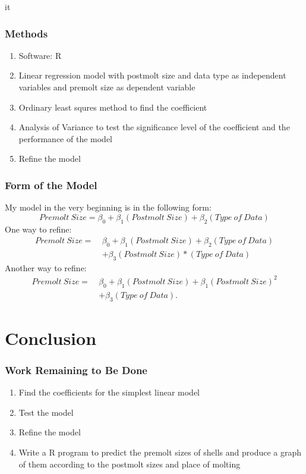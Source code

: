 it\documentclass[compress,handout,10pt]{beamer}
\let\olditem\item
\renewcommand{\item}{\setlength{\itemsep}{0.5\baselineskip}\olditem}
\begin{document}
\begin{frame}
    \frametitle{Methods}
     \begin{enumerate}
         \item Software: R
         \item Linear regression model with postmolt size and data type as independent variables and premolt size as dependent variable
         \item Ordinary least squres method to find the coefficient
         \item Analysis of Variance to test the significance level of the coefficient and the performance of the model
         \item Refine the model
     \end{enumerate}
\end{frame}

\begin{frame}
    \frametitle{Form of the Model}
     My model in the very beginning is in the following form:
     $$Premolt~Size=\beta_0 + \beta_1 (Postmolt~Size) + \beta_2 (Type~of~Data)$$
     One way to refine:
     \begin{align*}
      Premolt~Size = ~&\beta_0 + \beta_1 (Postmolt~Size) + \beta_2 (Type~of~Data)\\
               & + \beta_3 (Postmolt~Size)*(Type~of~Data)
     \end{align*}
     Another way to refine:
     \begin{align*}
      Premolt~Size = ~&\beta_0 + \beta_1 (Postmolt~Size) + \beta_1 (Postmolt~Size)^2\\
               & + \beta_3 (Type~of~Data).
     \end{align*}
\end{frame}

\section{Conclusion}
\begin{frame}
    \frametitle{Work Remaining to Be Done}
     \begin{enumerate}
         \item Find the coefficients for the simplest linear model
         \item Test the model
         \item Refine the model
	 \item Write a R program to predict the premolt sizes of shells and produce a graph of them according to the postmolt sizes and place of molting 
     \end{enumerate}
\end{frame}
\end{document}
